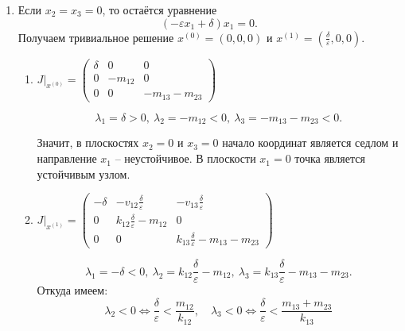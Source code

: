     \begin{enumerate}
        \item Если \( x_2 = x_3 = 0 \), то остаётся уравнение 
        \[ ( -\varepsilon x_1 + \delta ) x_1 = 0. \] 
        Получаем тривиальное решение \( x^{(0)} = (0,0,0) \) и \( x^{(1)} = \left(\frac{\delta}{\varepsilon}, 0, 0 \right) \).
        \begin{enumerate}
            \item \( J \big|_{x^{(0)}} = \left(
                \begin{matrix}
                    \delta & 0 & 0 \\
                    0 & -m_{12}  & 0 \\
                    0 & 0 & -m_{13}-m_{23}
                \end{matrix}
            \right) \)

            \[
                \lambda_1 = \delta> 0, ~
                \lambda_2 = -m_{12} < 0, ~
                \lambda_3 = -m_{13}-m_{23} < 0.
            \]

            Значит, в плоскостях \( x_2 = 0 \) и \( x_3 = 0 \) начало координат является седлом и направление \( x_1 \) -- неустойчивое. В плоскости \( x_1 = 0 \) точка является устойчивым узлом.

            \item \( J \big|_{x^{(1)}} = \left(
                \begin{matrix}
                    -\delta & -v_{12} \frac{\delta}{\varepsilon} & -v_{13} \frac{\delta}{\varepsilon} \\
                    0 & k_{12} \frac{\delta}{\varepsilon} - m_{12} & 0 \\
                    0 & 0 & k_{13} \frac{\delta}{\varepsilon} -m_{13} - m_{23}
                \end{matrix}
            \right) \)

            \[
                \lambda_1 = -\delta < 0, ~
                \lambda_2 = k_{12} \frac{\delta}{\varepsilon} - m_{12}, ~
                \lambda_3 = k_{13} \frac{\delta}{\varepsilon} -m_{13} - m_{23}. 
            \]
            Откуда имеем:
            \[
                \lambda_2 < 0 \Leftrightarrow \frac{\delta}{\varepsilon} < \frac{m_{12}}{k_{12}},
                \quad
                \lambda_3 < 0 \Leftrightarrow \frac{\delta}{\varepsilon} < \frac{m_{13} + m_{23}}{k_{13}}
            \]


\end{enumerate}
\end{enumerate}
